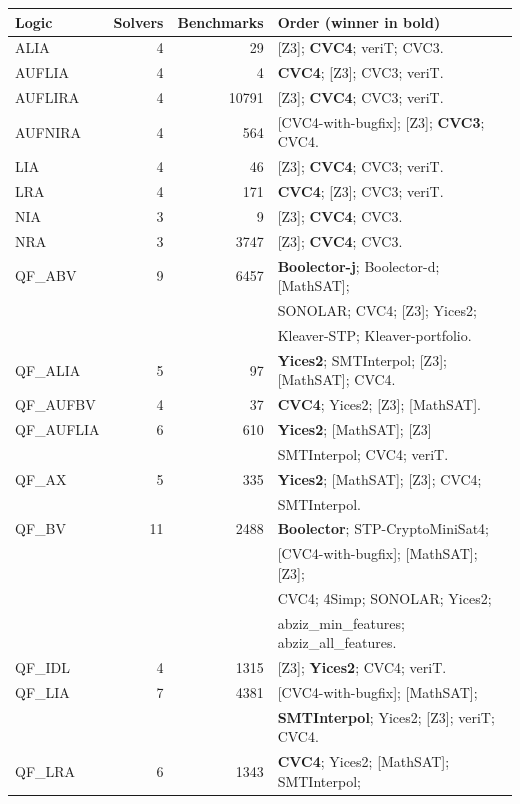 \documentclass[twoside,11pt]{article}
\begin{document}
\begin{table}
\centering
\newcommand{\win}[1]{\textbf{#1}}
\begin{tabular}{|l|r|r|l|}
\hline
Logic &	Solvers &	Benchmarks & Order (winner in bold) \\
\hline
ALIA & 		4 & 	29  & 	[Z3]; \win{CVC4}; veriT; CVC3. \\
AUFLIA & 	4 & 	4   & 	\win{CVC4}; [Z3]; CVC3; veriT. \\
AUFLIRA & 	4 & 	10791 & 	[Z3]; \win{CVC4}; CVC3; veriT. \\
AUFNIRA & 	4 & 	564 & 	[CVC4-with-bugfix]; [Z3]; \win{CVC3}; CVC4. \\
LIA & 		4 & 	46 & 	[Z3]; \win{CVC4}; CVC3; veriT. \\
LRA & 		4 & 	171 & 	\win{CVC4}; [Z3]; CVC3; veriT. \\
NIA & 		3 & 	9 &  	[Z3]; \win{CVC4}; CVC3. \\
NRA & 		3 & 	3747 & 	[Z3]; \win{CVC4}; CVC3. \\
QF\_ABV & 	9 & 	6457 & \win{Boolector-j}; Boolector-d; [MathSAT]; \\
& & & SONOLAR; CVC4; [Z3]; Yices2; \\
& & & Kleaver-STP; Kleaver-portfolio. \\
QF\_ALIA & 	5 & 	97 & \win{Yices2}; SMTInterpol; [Z3]; [MathSAT]; CVC4. \\
QF\_AUFBV & 	4 & 	37 & \win{CVC4}; Yices2; [Z3]; [MathSAT]. \\
QF\_AUFLIA & 	6 & 	610 & \win{Yices2}; [MathSAT]; [Z3] \\
& & & SMTInterpol; CVC4; veriT. \\
QF\_AX & 	5 & 	335 & \win{Yices2}; [MathSAT]; [Z3]; CVC4; \\
& & & SMTInterpol. \\
QF\_BV & 	11 & 	2488 & \win{Boolector}; STP-CryptoMiniSat4; \\
& & & [CVC4-with-bugfix]; [MathSAT]; [Z3]; \\
& & & CVC4; 4Simp; SONOLAR; Yices2; \\
& & & abziz\_min\_features; abziz\_all\_features. \\
QF\_IDL & 	4 & 	1315 & 	[Z3]; \win{Yices2}; CVC4; veriT. \\
QF\_LIA & 	7 & 	4381 & 	[CVC4-with-bugfix]; [MathSAT]; \\
& & & \win{SMTInterpol}; Yices2; [Z3]; veriT; CVC4. \\
QF\_LRA & 	6 & 	1343  & \win{CVC4}; Yices2; [MathSAT]; SMTInterpol; \\

\end{tabular}
\end{table}
\end{document}
